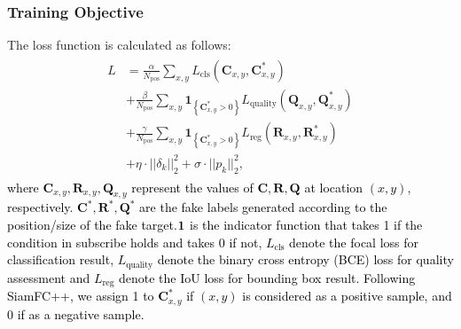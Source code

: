 \documentclass{article}
\begin{document}
\subsubsection{Training Objective}

The loss function is calculated as follows:
\begin{equation}
\begin{array}{l}
\begin{aligned}
L&=\frac{\alpha}{N_{\mathrm{pos}}} \sum_{x, y} L_{\mathrm{cls}}\left(\textbf{C}_{x, y}, \textbf{C}_{x, y}^{*}\right) \\
&+\frac{\beta}{N_{\mathrm{pos}}} \sum_{x, y} \textbf{1}_{\left\{\textbf{C}_{x, y}^{*}>0\right\}} L_{\mathrm{quality}}\left(\textbf{Q}_{x, y}, \textbf{Q}_{x, y}^{*}\right) \\
&+\frac{\gamma}{N_{\mathrm{pos}}} \sum_{x, y} \textbf{1}_{\left\{\textbf{C}_{x, y}^{*}>0\right\}} L_{\mathrm{reg}}\left(\textbf{R}_{x, y}, \textbf{R}_{x, y}^{*}\right) \\
&+\eta \cdot ||\delta_k||_2^2 +  \sigma \cdot ||p_k||^2_2,
\end{aligned}
\end{array}
\label{eq:loss}
\end{equation}
\textcolor{black} %
{where $\textbf{C}_{x, y}, \textbf{R}_{x, y}, \textbf{Q}_{x, y}$ represent the values of $\textbf{C}, \textbf{R}, \textbf{Q}$ at location $(x, y)$, respectively. $\textbf{C}^*, \textbf{R}^*, \textbf{Q}^*$ are the fake labels generated according to the position/size of the fake target.$\textbf 1$ is the indicator function that takes 1 if the condition in subscribe holds and takes 0 if not, $L_{\mathrm{cls}}$ denote the focal loss for classification result, $L_{\mathrm{quality}}$ denote the binary cross entropy (BCE) loss for quality assessment and $L_{\mathrm{reg}}$ denote the IoU loss \cite{iou-loss} for bounding box result. Following SiamFC++, we assign 1 to $\textbf{C}_{x, y}^{*}$ if $(x, y)$ is considered as a positive sample, and 0 if as a negative sample.}
\end{document}
